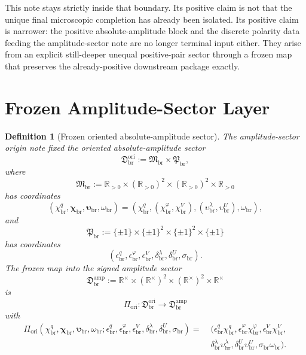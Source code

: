 \documentclass[11pt]{article}
\newcommand{\LiftSector}{\mathfrak D_{\mathrm{br}}^{\mathrm{amp}}}
\newcommand{\OriginSector}{\mathfrak D_{\mathrm{br}}^{\mathrm{ori}}}
\newcommand{\AbsAmpSector}{\mathfrak M_{\mathrm{br}}}
\newcommand{\PolaritySector}{\mathfrak P_{\mathrm{br}}}
\newcommand{\AbsReadAmp}{\chi_{\mathrm{br}}^{q}}
\newcommand{\AbsCovAmp}{\chi_{\mathrm{br}}^{\varphi}}
\newcommand{\AbsRelaxAmp}{\chi_{\mathrm{br}}^{V}}
\newcommand{\AbsKinAmp}{\bm\chi_{\mathrm{br}}}
\newcommand{\AbsWellAmp}{\upsilon_{\mathrm{br}}^{\lambda}}
\newcommand{\AbsEqAmp}{\upsilon_{\mathrm{br}}^{U}}
\newcommand{\AbsAnchorAmp}{\bm\upsilon_{\mathrm{br}}}
\newcommand{\AbsScaleAmp}{\omega_{\mathrm{br}}}
\newcommand{\PolRead}{\epsilon_{\mathrm{br}}^{q}}
\newcommand{\PolCov}{\epsilon_{\mathrm{br}}^{\varphi}}
\newcommand{\PolRelax}{\epsilon_{\mathrm{br}}^{V}}
\newcommand{\PolWell}{\delta_{\mathrm{br}}^{\lambda}}
\newcommand{\PolEq}{\delta_{\mathrm{br}}^{U}}
\newcommand{\PolScale}{\sigma_{\mathrm{br}}}
\newcommand{\OriginMap}{\Pi_{\mathrm{ori}}}
\newcommand{\Rstar}{\mathbb R^{\times}}
\newtheorem{definition}{Definition}
\begin{document}
This note stays strictly inside that boundary. Its positive claim is not that the unique final microscopic completion has already been isolated. Its positive claim is narrower: the positive absolute-amplitude block and the discrete polarity data feeding the amplitude-sector note are no longer terminal input either. They arise from an explicit still-deeper unequal positive-pair sector through a frozen map that preserves the already-positive downstream package exactly.

\section{Frozen Amplitude-Sector Layer}

\begin{definition}[Frozen oriented absolute-amplitude sector]
\label{def:frozenorigin}
The amplitude-sector origin note fixed the oriented absolute-amplitude sector
\begin{equation}
\OriginSector
:=
\AbsAmpSector\times\PolaritySector,
\label{eq:originsector}
\end{equation}
where
\begin{equation}
\AbsAmpSector
:=
\mathbb R_{>0}\times(\mathbb R_{>0})^{2}\times(\mathbb R_{>0})^{2}\times\mathbb R_{>0}
\label{eq:abssector}
\end{equation}
has coordinates
\begin{equation}
(\AbsReadAmp,\AbsKinAmp,\AbsAnchorAmp,\AbsScaleAmp)
=
(\AbsReadAmp,(\AbsCovAmp,\AbsRelaxAmp),(\AbsWellAmp,\AbsEqAmp),\AbsScaleAmp),
\label{eq:abscoords}
\end{equation}
and
\begin{equation}
\PolaritySector
:=
\{\pm1\}\times\{\pm1\}^{2}\times\{\pm1\}^{2}\times\{\pm1\}
\label{eq:polsector}
\end{equation}
has coordinates
\begin{equation}
(\PolRead,\PolCov,\PolRelax,\PolWell,\PolEq,\PolScale).
\label{eq:polcoords}
\end{equation}
The frozen map into the signed amplitude sector
\begin{equation}
\LiftSector
:=
\Rstar\times(\Rstar)^{2}\times(\Rstar)^{2}\times\Rstar
\label{eq:liftsector}
\end{equation}
is
\begin{equation}
\OriginMap:\OriginSector\longrightarrow\LiftSector
\label{eq:originmap}
\end{equation}
with
\begin{align}
\OriginMap(\AbsReadAmp,\AbsKinAmp,\AbsAnchorAmp,\AbsScaleAmp;\PolRead,\PolCov,\PolRelax,\PolWell,\PolEq,\PolScale)
=\;&
(\PolRead\AbsReadAmp,\PolCov\AbsCovAmp,\PolRelax\AbsRelaxAmp,
\nonumber\\
&\PolWell\AbsWellAmp,\PolEq\AbsEqAmp,\PolScale\AbsScaleAmp).
\label{eq:originmapexplicit}
\end{align}
\end{definition}
\end{document}
